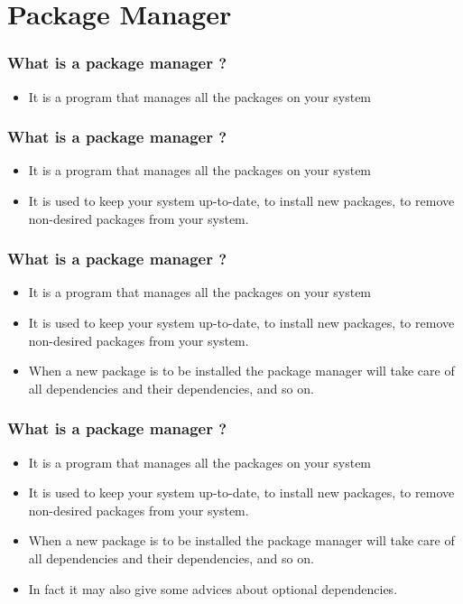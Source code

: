 \section{Package Manager}
\begin{frame}
    \frametitle{What is a package manager ?}
    \begin{itemize}
        \item It is a program that manages all the packages on your system
    \end{itemize}
\end{frame}
\begin{frame}
    \frametitle{What is a package manager ?}
    \begin{itemize}
        \item It is a program that manages all the packages on your system
        \item It is used to keep your system up-to-date, to install new
        packages, to remove non-desired packages from your system.
    \end{itemize}
\end{frame}
\begin{frame}
    \frametitle{What is a package manager ?}
    \begin{itemize}
        \item It is a program that manages all the packages on your system
        \item It is used to keep your system up-to-date, to install new
        packages, to remove non-desired packages from your system.
        \item When a new package is to be installed the package manager will
        take care of all dependencies and their dependencies, and so on.
    \end{itemize}
\end{frame}
\begin{frame}
    \frametitle{What is a package manager ?}
    \begin{itemize}
        \item It is a program that manages all the packages on your system
        \item It is used to keep your system up-to-date, to install new
        packages, to remove non-desired packages from your system.
        \item When a new package is to be installed the package manager will
        take care of all dependencies and their dependencies, and so on.
        \item In fact it may also give some advices about optional
        dependencies.
    \end{itemize}
\end{frame}
